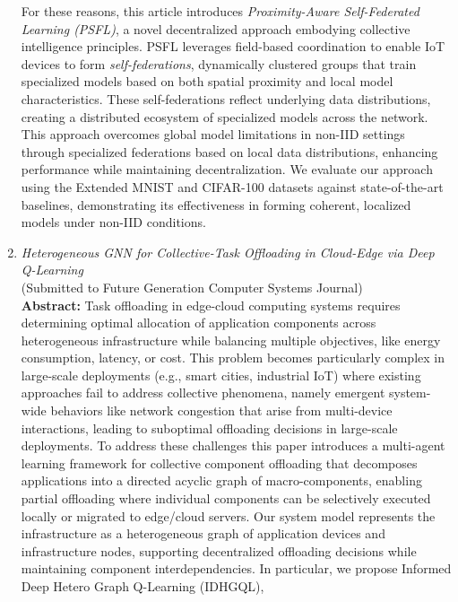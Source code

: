 \documentclass[runningheads]{llncs}
\begin{document}
\begin{enumerate}
    For these reasons, this article introduces \emph{Proximity-Aware Self-Federated Learning (PSFL)}, 
     a novel decentralized approach embodying collective intelligence principles. 
    PSFL leverages field-based coordination to enable IoT devices to form \emph{self-federations},
     dynamically clustered groups that train specialized models based on both spatial proximity and local model characteristics. 
     These self-federations reflect underlying data distributions, 
     creating a distributed ecosystem of specialized models across the network.
    This approach overcomes global model limitations in non-IID settings through 
     specialized federations based on local data distributions, enhancing performance
     while maintaining decentralization.
    We evaluate our approach using the Extended MNIST and CIFAR-100 datasets against state-of-the-art baselines,
     demonstrating its effectiveness in forming coherent, 
     localized models under non-IID conditions.
    \item \emph{Heterogeneous GNN for Collective-Task Offloading in Cloud-Edge via Deep Q-Learning} \\ (Submitted to Future Generation Computer Systems Journal) \\
    \textbf{Abstract: }
    Task offloading in edge-cloud computing systems requires determining optimal allocation of 
     application components across heterogeneous infrastructure while balancing multiple objectives, 
     like energy consumption, latency, or cost.
    This problem becomes particularly complex in large-scale deployments (e.g., smart cities, industrial IoT) 
     where existing approaches fail to address collective phenomena, 
     namely emergent system-wide behaviors like network congestion that arise from multi-device interactions, 
     leading to suboptimal offloading decisions in large-scale deployments.
    To address these challenges 
     this paper introduces a multi-agent learning framework for collective component offloading 
     that decomposes applications into a directed acyclic graph of macro-components, 
     enabling partial offloading where individual components can be selectively executed locally or migrated to edge/cloud servers.
    Our system model represents the infrastructure as a heterogeneous graph of application devices 
     and infrastructure nodes, 
     supporting decentralized offloading decisions while maintaining component interdependencies.
     In particular, we propose Informed Deep Hetero Graph Q-Learning (IDHGQL), 

\end{enumerate}
\end{document}
